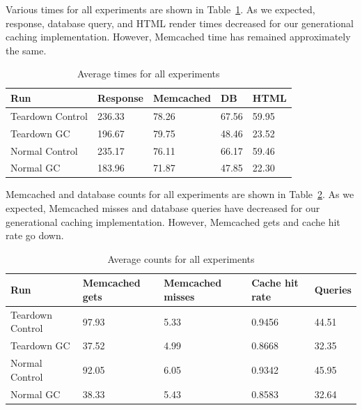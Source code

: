 \documentclass[12pt]{ucthesis}
\begin{document}
Various times for all experiments are shown in Table~\ref{tab:averageExperimentTimes}.
As we expected, response, database query, and HTML render times decreased for our generational caching implementation.
However, \textsf{Memcached} time has remained approximately the same.

\begin{table}[h]
\begin{center}
\begin{tabular}{| l | l | l | l | l |}
   \hline
   Run & Response & Memcached & DB & HTML \\ \hline
   Teardown Control & 236.33 & 78.26 & 67.56 & 59.95 \\ \hline
   Teardown GC & 196.67 & 79.75 & 48.46 & 23.52 \\ \hline
   \hline
   Normal Control & 235.17 & 76.11 & 66.17 & 59.46 \\ \hline
   Normal GC & 183.96 & 71.87 & 47.85 & 22.30 \\
   \hline
\end{tabular}
\end{center}
\caption{Average times for all experiments}
\label{tab:averageExperimentTimes}
\end{table}

\textsf{Memcached} and database counts for all experiments are shown in Table~\ref{tab:averageExperimentCounts}.
As we expected, \textsf{Memcached} misses and database queries have decreased for our generational caching implementation.
However, \textsf{Memcached} gets and cache hit rate go down.

\begin{table}[h]
\begin{center}
\begin{tabular}{| l | l | l | l | l |}
   \hline
   Run & Memcached gets & Memcached misses & Cache hit rate & Queries \\ \hline
   Teardown Control & 97.93 & 5.33 & 0.9456 & 44.51 \\ \hline
   Teardown GC & 37.52 & 4.99 & 0.8668 & 32.35 \\ \hline
   \hline
   Normal Control & 92.05 & 6.05 & 0.9342 & 45.95 \\ \hline
   Normal GC & 38.33 & 5.43 & 0.8583 & 32.64 \\
   \hline
\end{tabular}
\end{center}
\caption{Average counts for all experiments}
\label{tab:averageExperimentCounts}
\end{table}
\end{document}
